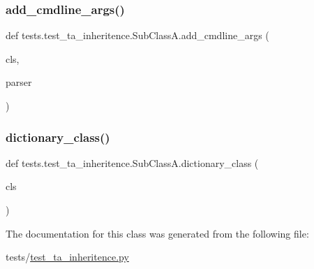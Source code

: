 \subsubsection{\texorpdfstring{add\+\_\+cmdline\+\_\+args()}{add\_cmdline\_args()}}
{\footnotesize\ttfamily def tests.\+test\+\_\+ta\+\_\+inheritence.\+Sub\+Class\+A.\+add\+\_\+cmdline\+\_\+args (\begin{DoxyParamCaption}\item[{}]{cls,  }\item[{}]{parser }\end{DoxyParamCaption})}

\mbox{\label{classtests_1_1test__ta__inheritence_1_1SubClassA_aa01b5f43121b539c377b9b1d50f93d0c}} 
\subsubsection{\texorpdfstring{dictionary\+\_\+class()}{dictionary\_class()}}
{\footnotesize\ttfamily def tests.\+test\+\_\+ta\+\_\+inheritence.\+Sub\+Class\+A.\+dictionary\+\_\+class (\begin{DoxyParamCaption}\item[{}]{cls }\end{DoxyParamCaption})}



The documentation for this class was generated from the following file\+:\begin{DoxyCompactItemize}
\item 
tests/\hyperlink{test__ta__inheritence_8py}{test\+\_\+ta\+\_\+inheritence.\+py}\end{DoxyCompactItemize}
